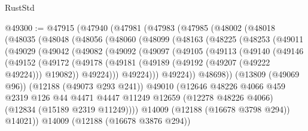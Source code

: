\begin{lexlean}{RustStd}
\begin{coremodule}
@49300 := @47915
    (@47940
      (@47981
        (@47983
          (@47985
            (@48002
              (@48018
                (@48035
                  (@48048
                    (@48056
                      (@48060
                        (@48099
                          (@48163
                            (@48225
                              (@48253
                                (@49011
                                  (@49029
                                    (@49042
                                      (@49082
                                        (@49092
                                          (@49097
                                            (@49105
                                              (@49113
                                                (@49140
                                                  (@49146
                                                    (@49152
                                                      (@49172
                                                        (@49178
                                                          (@49181
                                                            (@49189
                                                              (@49192 (@49207 (@49222 @49224)))
                                                              @19082))
                                                          @49224)))
                                                    @49224)))
                                              @49224))
                                          @48698))
                                      (@13809 (@49069 @96))
                                      (@12188 (@49073 @293 @241))
                                      @49010
                                      (@12646
                                        @48226
                                        @4066
                                        @459
                                        @2319
                                        @126
                                        @44
                                        @4471
                                        @4447
                                        @11249
                                        @12659
                                        (@12278 @48226 @4066)
                                        (@12834 (@15189 @2319 @11249))))
                                    @14009
                                    (@12188 (@16678 @3798 @294))
                                    @14021))
                                @14009
                                (@12188 (@16678 @3876 @294))

\end{coremodule}
\end{lexlean}
